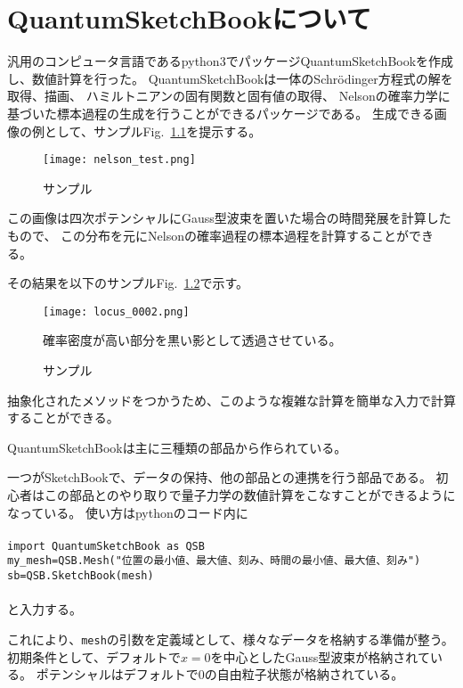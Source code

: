 \documentclass[autodetect-engine,dvipdfmx-if-dvi,ja=standard,a4paper,layout=v2]{bxjsreport}
\newcommand{\fref}[1]{Fig.~\ref{#1}}
\begin{document}
    \chapter{QuantumSketchBookについて}
    汎用のコンピュータ言語であるpython3でパッケージQuantumSketchBookを作成し、数値計算を行った。
    QuantumSketchBookは一体のSchrödinger方程式の解を取得、描画、
    ハミルトニアンの固有関数と固有値の取得、
    Nelsonの確率力学に基づいた標本過程の生成を行うことができるパッケージである。
    生成できる画像の例として、サンプル\fref{sample}を提示する。
    \begin{figure}
      \centering
      \texttt{[image: nelson\_test.png]}
      \caption{サンプル}
      \label{sample}
    \end{figure}
      この画像は四次ポテンシャルにGauss型波束を置いた場合の時間発展を計算したもので、
      この分布を元にNelsonの確率過程の標本過程を計算することができる。\par
      その結果を以下のサンプル\fref{locus}で示す。\par
    \begin{figure}
      \centering
      \texttt{[image: locus\_0002.png]}
      \caption{サンプル}
      \label{locus}
      \footnotesize{
        確率密度が高い部分を黒い影として透過させている。
      }
    \end{figure}
    抽象化されたメソッドをつかうため、このような複雑な計算を簡単な入力で計算することができる。\par
    QuantumSketchBookは主に三種類の部品から作られている。\par
    一つがSketchBookで、データの保持、他の部品との連携を行う部品である。
    初心者はこの部品とのやり取りで量子力学の数値計算をこなすことができるようになっている。
    使い方はpythonのコード内に\\\\
    \texttt{import \: QuantumSketchBook \: as QSB\\
            my\_mesh\:=\:QSB.Mesh("位置の最小値、最大値、刻み、時間の最小値、最大値、刻み")\\
            sb\:=\:QSB.SketchBook(mesh)}\\\\
    と入力する。\par
    これにより、\texttt{mesh}の引数を定義域として、様々なデータを格納する準備が整う。
    初期条件として、デフォルトで$x=0$を中心としたGauss型波束が格納されている。
    ポテンシャルはデフォルトで$0$の自由粒子状態が格納されている。\par
\end{document}
